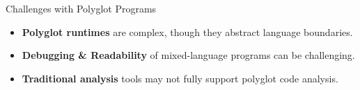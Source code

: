 \begin{frame}{Challenges with Polyglot Programs}
    \begin{itemize}
        \item \textbf{Polyglot runtimes} are complex, though they abstract language boundaries.
        \vspace{3mm}
        \item \textbf{Debugging \& Readability} of mixed-language programs can be challenging.
        \vspace{3mm}
        \item \textbf{Traditional analysis} tools may not fully support polyglot code analysis.
    \end{itemize}
\end{frame}

